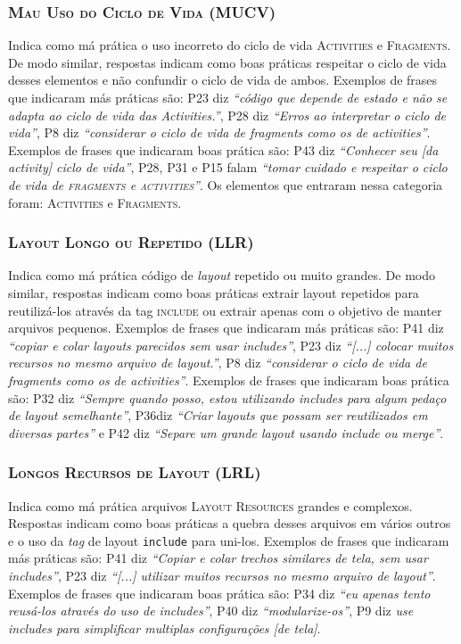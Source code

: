 \subsubsection{\textsc{Mau Uso do Ciclo de Vida (MUCV)}}
Indica como má prática o uso incorreto do ciclo de vida \textsc{Activities} e \textsc{Fragments}. De modo similar, respostas indicam como boas práticas respeitar o ciclo de vida desses elementos e não confundir o ciclo de vida de ambos. Exemplos de frases que indicaram más práticas são: P23 diz \textit{``código que depende de estado e não se adapta ao ciclo de vida das Activities.''}, P28 diz \textit{``Erros ao interpretar o ciclo de vida''}, P8 diz \textit{``considerar o ciclo de vida de fragments como os de activities''}. Exemplos de frases que indicaram boas prática são: P43 diz \textit{``Conhecer seu [da activity] ciclo de vida''}, P28, P31 e P15 falam \textit{``tomar cuidado e respeitar o ciclo de vida de \textsc{fragments} e \textsc{activities}''}. Os elementos que entraram nessa categoria foram: \textsc{Activities} e \textsc{Fragments}. 

\subsubsection{\textsc{Layout Longo ou Repetido (LLR)}}
Indica como má prática código de \textit{layout} repetido ou muito grandes. De modo similar, respostas indicam como boas práticas extrair layout repetidos para reutilizá-los através da tag \textsc{include} ou extrair apenas com o objetivo de manter arquivos pequenos. Exemplos de frases que indicaram más práticas são: P41 diz \textit{``copiar e colar layouts parecidos sem usar includes''}, P23 diz \textit{``[...] colocar muitos recursos no mesmo arquivo de layout.''}, P8 diz \textit{``considerar o ciclo de vida de fragments como os de activities''}. Exemplos de frases que indicaram boas prática são: P32 diz \textit{``Sempre quando posso, estou utilizando includes para algum pedaço de layout semelhante''}, P36diz \textit{``Criar layouts que possam ser reutilizados em diversas partes''} e P42 diz \textit{``Separe um grande layout usando include ou merge''}. 


\subsubsection{\textsc{Longos Recursos de Layout (LRL)}}
Indica como má prática arquivos \textsc{Layout Resources} grandes e complexos. Respostas indicam como boas práticas a quebra desses arquivos em vários outros e o uso da \textit{tag} de layout \texttt{include} para uni-los. Exemplos de frases que indicaram más práticas são: P41 diz \textit{``Copiar e colar trechos similares de tela, sem usar includes''}, P23 diz \textit{``[...] utilizar muitos recursos no mesmo arquivo de layout''}. Exemplos de frases que indicaram boas prática são: P34 diz \textit{``eu apenas tento reusá-los através do uso de includes''}, P40 diz \textit{``modularize-os''}, P9 diz \textit{use includes para simplificar multiplas configurações [de tela]}. 

